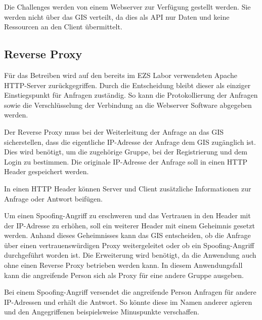Die Challenges werden von einem Webserver zur Verfügung gestellt werden. Sie werden nicht über das GIS verteilt, da dies als API nur Daten und keine Ressourcen an den Client übermittelt.

\subsection{Reverse Proxy}
Für das Betreiben wird auf den bereits im EZS Labor verwendeten Apache HTTP-Server zurückgegriffen. Durch die Entscheidung bleibt dieser als einziger Einstiegspunkt für Anfragen zuständig. So kann die Protokollierung der Anfragen sowie die Verschlüsselung der Verbindung an die Webserver Software abgegeben werden.

Der Reverse Proxy muss bei der Weiterleitung der Anfrage an das GIS sicherstellen, dass die eigentliche IP-Adresse der Anfrage dem GIS zugänglich ist. Dies wird benötigt, um die zugehörige Gruppe, bei der Registrierung und dem Login zu bestimmen. Die originale IP-Adresse der Anfrage soll in einen HTTP Header gespeichert werden.

In einen HTTP Header können Server und Client zusätzliche Informationen zur Anfrage oder Antwort beifügen. \cite{mdncontributorsHTTPHeaders2020}

Um einen Spoofing-Angriff zu erschweren und das Vertrauen in den Header mit der IP-Adresse zu erhöhen, soll ein weiterer Header mit einem Geheimnis gesetzt werden. Anhand dieses Geheimnisses kann das GIS entscheiden, ob die Anfrage über einen vertrauenswürdigen Proxy weitergeleitet oder ob ein Spoofing-Angriff durchgeführt worden ist. Die Erweiterung wird benötigt, da die Anwendung auch ohne einen Reverse Proxy betrieben werden kann. In diesem Anwendungsfall kann die angreifende Person sich als Proxy für eine andere Gruppe ausgeben.

Bei einem Spoofing-Angriff versendet die angreifende Person Anfragen für andere IP-Adressen und erhält die Antwort. So könnte diese im Namen anderer agieren und den Angegriffenen beispielsweise Minuspunkte verschaffen.